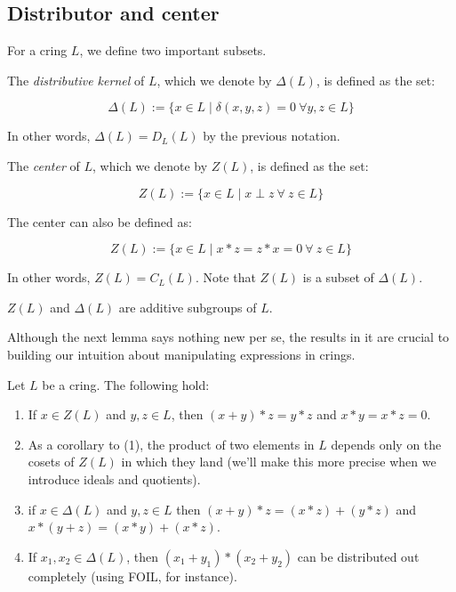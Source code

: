 \documentclass[10pt]{amsart}
\begin{document}
\subsection{Distributor and center}

For a cring $L$, we define two important subsets.

The {\em distributive kernel} of $L$, which we denote by $\Delta(L)$,
is defined as the set:

\begin{equation}
  \Delta(L) := \{ x \in L \mid \delta(x,y,z) = 0 \ \forall y,z \in L \}
\end{equation}

In other words, $\Delta(L) = D_L(L)$ by the previous notation.

The {\em center} of $L$, which we denote by $Z(L)$, is defined as the set:

\begin{equation}
  Z(L) := \{ x \in L \mid x \perp z \ \forall \ z \in L \}
\end{equation}

The center can also be defined as:

\begin{equation}
  Z(L) := \{ x \in L \mid x * z = z * x = 0 \ \forall \ z \in L \}
\end{equation}

In other words, $Z(L) = C_L(L)$. Note that $Z(L)$ is a subset of
$\Delta(L)$.

\begin{lemma}
  $Z(L)$ and $\Delta(L)$ are additive subgroups of $L$.
\end{lemma}

Although the next lemma says nothing new per se, the results in it
are crucial to building our intuition about manipulating expressions
in crings.

\begin{lemma}
  Let $L$ be a cring. The following hold:

  \begin{enumerate}
  \item If $x \in Z(L)$ and $y,z \in L$, then $(x + y) * z = y * z$
    and $x * y = x * z = 0$. 
  \item As a corollary to (1), the product of two elements in $L$
    depends only on the cosets of $Z(L)$ in which they land (we'll 
    make this more precise when we introduce ideals and quotients).
  \item if $x \in \Delta(L)$ and $y,z \in L$ then $(x + y) * z = (x *
    z) + (y * z)$ and $x * (y + z) = (x * y) + (x * z)$.
  \item If $x_1,x_2 \in \Delta(L)$, then $(x_1 + y_1) * (x_2 + y_2)$
    can be distributed out completely (using FOIL, for instance).
  \end{enumerate}
\end{lemma}
\end{document}
